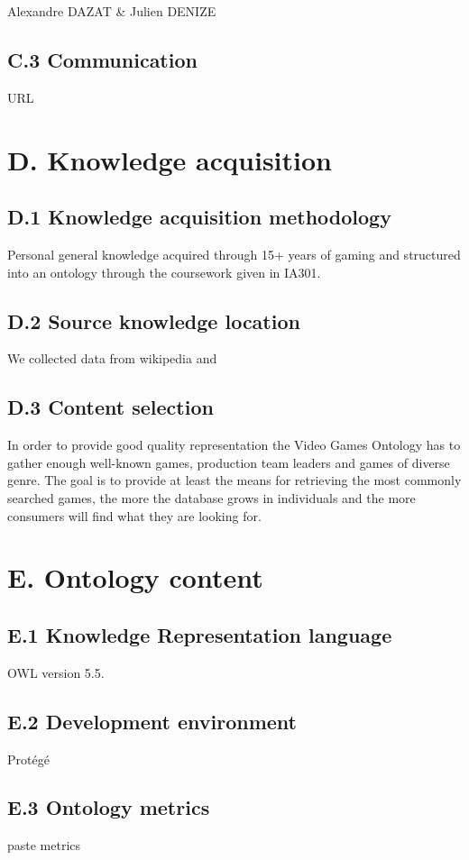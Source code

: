 \documentclass{article}
\begin{document}
Alexandre DAZAT & Julien DENIZE
\subsection*{C.3 Communication}

URL
\section*{D. Knowledge acquisition}

\subsection*{D.1 Knowledge acquisition methodology}

Personal general knowledge acquired through 15+ years of gaming and structured into an ontology through the coursework given in IA301. 
\subsection*{D.2 Source knowledge location}
We collected data from wikipedia and
\subsection*{D.3 Content selection}


In order to provide good quality representation the Video Games Ontology has to gather enough well-known games, production team leaders and games of diverse genre. The goal is to provide at least the means for retrieving the most commonly searched games, the more the database grows in individuals and the more consumers will find what they are looking for. 
\section*{E. Ontology content}

\subsection*{E.1 Knowledge Representation language}
OWL version 5.5. 
\subsection*{E.2 Development environment}
Protégé
\subsection*{E.3 Ontology metrics}
paste metrics 
\end{document}
